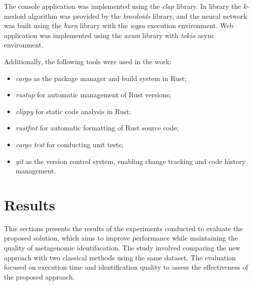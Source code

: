 \documentclass[pdflatex,sn-vancouver-num]{sn-jnl}%
\begin{document}
            The console application was implemented using the \textit{clap} library\cite{Rust:clap}. In library the $k$-medoid algorithm was provided by the \textit{kmedoids} library\cite{Rust:kmedoids}, and the neural network was built using the \textit{burn} library\cite{Rust:burn} with the \textit{wgpu} execution environment. Web application was implemented using the \textit{axum} library\cite{Rust:axum} with \textit{tokio}\cite{Rust:axum} async environment.

            Additionally, the following tools were used in the work:
            \begin{itemize}
                \item \textit{cargo} as the package manager and build system in Rust;
                \item \textit{rustup} for automatic management of Rust versions;
                \item \textit{clippy} for static code analysis in Rust;
                \item \textit{rustfmt} for automatic formatting of Rust source code;
                \item \textit{cargo test} for conducting unit tests;
                \item \textit{git} as the version control system, enabling change tracking and code history management.
            \end{itemize}


                \section{Results}

                This sections presents the results of the experiments conducted to evaluate the proposed solution, which aims to improve performance while maintaining the quality of metagenomic identifacation. The study involved comparing the new approach with two classical methods using the same dataset. The evaluation focused on execution time and identification quality to assess the effectiveness of the proposed approach.


\end{document}
